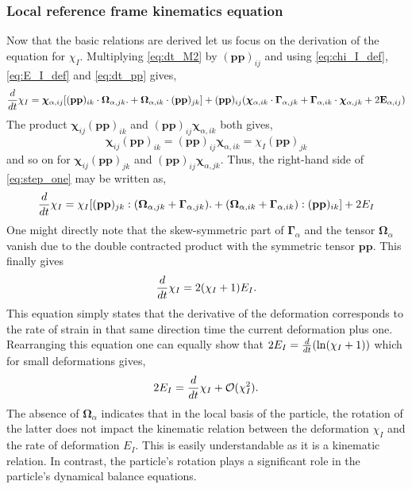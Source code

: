 \subsubsection{Local reference frame kinematics   equation}

Now that the basic relations are derived let us focus on the derivation of the equation for $\chi_I$. 
Multiplying \ref{eq:dt_M2} by $(\textbf{pp})_{ij}$ and using \ref{eq:chi_I_def},\ref{eq:E_I_def} and  \ref{eq:dt_pp} gives, 
\begin{equation}
    \ddt \chi_I
    = 
    \bm\chi_{\alpha,ij} [(\textbf{pp})_{ik}\cdot\bm\Omega_{\alpha,jk}. 
    +\bm\Omega_{\alpha,ik}\cdot (\textbf{pp})_{jk}]
    + (\textbf{pp})_{ij}(\bm\chi_{\alpha,ik} \cdot \bm\Gamma_{\alpha,jk}
    + \bm\Gamma_{\alpha,ik} \cdot \bm\chi_{\alpha,jk}
    + 2\textbf{E}_{\alpha,ij})
    \label{eq:step_one}
\end{equation}
The product $\bm\chi_{ij} (\textbf{pp})_{ik}$ and $(\textbf{pp})_{ij}\bm\chi_{\alpha,ik}$ both gives, 
\begin{equation*}
    \bm\chi_{ij} (\textbf{pp})_{ik}
    =
    (\textbf{pp})_{ij}\bm\chi_{\alpha,ik}
    = 
    \chi_I (\textbf{pp})_{jk}
\end{equation*}
and so on for $\bm\chi_{ij} (\textbf{pp})_{jk}$ and $(\textbf{pp})_{ij} \bm\chi_{\alpha,jk}$. 
Thus, the right-hand side of \ref{eq:step_one} may be written as, 
\begin{equation}
    \ddt \chi_I
    = 
    \chi_I [(\textbf{pp})_{jk}:(\bm\Omega_{\alpha,jk} + \bm\Gamma_{\alpha,jk}). 
    +(\bm\Omega_{\alpha,ik} + \bm\Gamma_{\alpha,ik}) :(\textbf{pp})_{ik}]
    + 2E_I
    \label{eq:step_two}
\end{equation}
One might directly note that the skew-symmetric part of $\bm\Gamma_\alpha$ and the tensor $\bm\Omega_\alpha$ vanish due to the double contracted product with the symmetric tensor $\textbf{pp}$. 
This finally gives 
\begin{equation}
    \ddt \chi_I
    = 
    2(\chi_I +1)E_I. 
    \label{eq:dt_chi_I}
\end{equation}
This equation simply states that the derivative of the deformation corresponds to the rate of strain in that same direction time the current deformation plus one.  
Rearranging this equation one can equally show that $2E_I = \frac{d}{dt} (\ln(\chi_I+1))$ which for small deformations gives,
\begin{equation}
    2E_I =  \ddt \chi_I + \mathcal{O}(\chi_I^2). 
    \label{eq:small_def}
\end{equation}
The absence of $\bm\Omega_\alpha$ indicates that in the local basis of the particle, the rotation of the latter does not impact the kinematic relation between the deformation $\chi_I$ and the rate of deformation $E_I$.
This is easily understandable as it is a kinematic relation. 
In contrast, the particle's rotation plays a significant role in the particle's dynamical balance equations.


